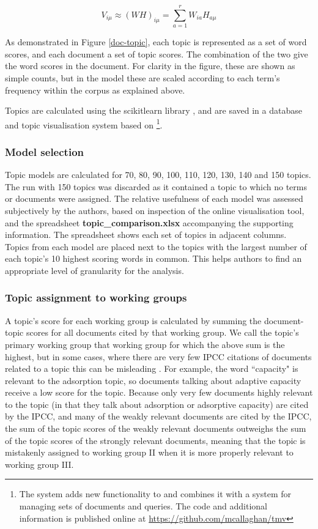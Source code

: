 \documentclass{article}
\begin{document}
\begin{linenumbers}
	\begin{equation}
		V_{i\mu} \approx (WH)_{i\mu} = \sum_{a=1}^{r}W_{ia}H_{a\mu}
	\end{equation}
	
	As demonstrated in Figure \ref{doc-topic}, each topic is represented as a set of word scores, and each document a set of topic scores. The combination of the two give the word scores in the document. For clarity in the figure, these are shown as simple counts, but in the model these are scaled according to each term's frequency within the corpus as explained above.
	
	Topics are calculated using the scikitlearn library \cite{Pedregosa2011}, and are saved in a database and topic visualisation system based on \cite{Chaney2012} \footnote{The system adds new functionality to \cite{Chaney2012} and combines it with a system for managing sets of documents and queries. The code and additional information is published online at \url{https://github.com/mcallaghan/tmv}}. 	
	
	\subsubsection*{Model selection}
	
	Topic models are calculated for 70, 80, 90, 100, 110, 120, 130, 140 and 150 topics. The run with 150 topics was discarded as it contained a topic to which no terms or documents were assigned. The relative usefulness of each model was assessed subjectively by the authors, based on inspection of the online visualisation tool, and the spreadsheet \textbf{topic\_comparison.xlsx} accompanying the supporting information. The spreadsheet shows each set of topics in adjacent columns. Topics from each model are placed next to the topics with the largest number of each topic's 10 highest scoring words in common. This helps authors to find an appropriate level of granularity for the analysis. 
	
	\subsubsection*{Topic assignment to working groups}
	\label{topic-wg}
	A topic's score for each working group is calculated by summing the document-topic scores for all documents cited by that working group. We call the topic's primary working group that working group for which the above sum is the highest, but in some cases, where there are very few IPCC citations of documents related to a topic this can be misleading . For example, the word ``capacity" is relevant to the adsorption topic, so documents talking about adaptive capacity receive a low score for the topic. Because only very few documents highly relevant to the topic (in that they talk about adsorption or adsorptive capacity) are cited by the IPCC, and many of the weakly relevant documents are cited by the IPCC, the sum of the topic scores of the weakly relevant documents outweighs the sum of the topic scores of the strongly relevant documents, meaning that the topic is mistakenly assigned to working group II when it is more properly relevant to working group III.
	

\end{linenumbers}
\end{document}
